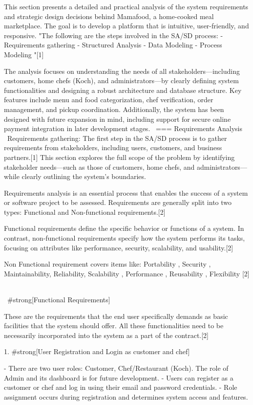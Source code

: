 This section presents a detailed and practical analysis of the system requirements and strategic design decisions behind Mamafood, a home-cooked meal marketplace. The goal is to develop a platform that is intuitive, user-friendly, and responsive. 
"The following are the steps involved in the SA/SD process: 
- Requirements gathering
- Structured Analysis
- Data Modeling
- Process Modeling "[1]

The analysis focuses on understanding the needs of all stakeholders—including customers, home chefs (Koch), and administrators—by clearly defining system functionalities and designing a robust architecture and database structure. Key features include menu and food categorization, chef verification, order management, and pickup coordination. Additionally, the system has been designed with future expansion in mind, including support for secure online payment integration in later development stages.
\
=== Requirements Analysis
\
Requirements gathering: The first step in the SA/SD process is to gather requirements from stakeholders, including users, customers, and business partners.[1]
This section explores the full scope of the problem by identifying stakeholder needs—such as those of customers, home chefs, and administrators—while clearly outlining the system’s boundaries. 

Requirements analysis is an essential process that enables the success of a system or software project to be assessed. Requirements are generally split into two types: Functional and Non-functional requirements.[2]

Functional requirements define the specific behavior or functions of a system. In contrast, non-functional requirements specify how the system performs its tasks, focusing on attributes like performance, security, scalability, and usability.[2]

Non Functional requirement covers items like:
Portability , Security , Maintainability, Reliability, Scalability , Performance , Reusability , Flexibility [2]
\

\
#strong[Functional Requirements]

These are the requirements that the end user specifically demands as basic facilities that the system should offer. All these functionalities need to be necessarily incorporated into the system as a part of the contract.[2]

1. #strong[User Registration and Login as customer and chef]

  - There are two user roles: Customer, Chef/Restaurant (Koch). The role of Admin and its dashboard is for future development.
  - Users can register as a customer or chef and log in using their email and password credentials.
  - Role assignment occurs during registration and determines system access and features.

